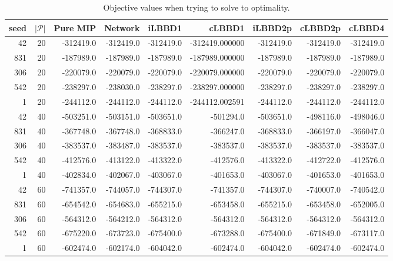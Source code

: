 \begin{table*}
    \centering
    \caption{Objective values when trying to solve to optimality.}
    \begin{tabular}{rrrrrrrrr} \toprule
        seed & $|\mathcal{P}|$ & Pure MIP & Network & iLBBD1 & cLBBD1 & iLBBD2p & cLBBD2p & cLBBD4 \\\midrule
  42      &      20         & -312419.0 &    -312419.0     & -312419.0 &-312419.000000 & -312419.0 & -312419.0 & -312419.0 \\
 831      &      20         & -187989.0  &   -187989.0     &-187989.0 & -187989.000000 & -187989.0 & -187989.0 &-187989.0 \\
  306      &      20       & -220079.0 &   -220079.0        &-220079.0 & -220079.000000 & -220079.0 & -220079.0 & -220079.0 \\
 542       &     20        & -238297.0 &  -238030.0        &-238297.0 & -238297.000000 & -238297.0 & -238297.0 & -238297.0 \\
    1      &      20       & -244112.0 &  -244112.0        &-244112.0 & -244112.002591 & -244112.0  & -244112.0 & -244112.0 \\\midrule
    42       &    40& -503251.0& -503151.0&-503651.0& -501294.0& -503651.0& -498116.0& -498046.0 \\
    831     &       40& -367748.0&-367748.0& -368833.0& -366247.0& -368833.0& -366197.0& -366047.0 \\
    306   &         40& -383537.0&-383487.0& -383537.0& -383537.0& -383537.0& -383537.0& -383537.0 \\
    542   &         40& -412576.0&-413122.0& -413322.0& -412576.0& -413322.0& -412722.0& -412576.0 \\
    1     &       40& -402834.0&-402067.0& -403067.0& -401653.0& -403067.0& -401653.0& -401653.0 \\\midrule
    42     &       60 &-741357.0&-744057.0& -744307.0& -741357.0 &-744307.0& -740007.0& -740542.0 \\
    831   &         60& -654542.0&-654683.0& -655215.0& -653458.0& -655215.0& -653458.0 &-652005.0\\
    306    &        60& -564312.0&-564212.0& -564312.0& -564312.0 &-564312.0& -564312.0& -564312.0\\
    542     &       60& -675220.0&-673723.0& -675400.0& -673288.0& -675400.0& -671849.0& -673117.0\\
    1       &     60 &-602474.0&-602174.0& -604042.0& -602474.0& -604042.0 &-602474.0& -602474.0\\\midrule

\end{tabular}
\end{table*}
